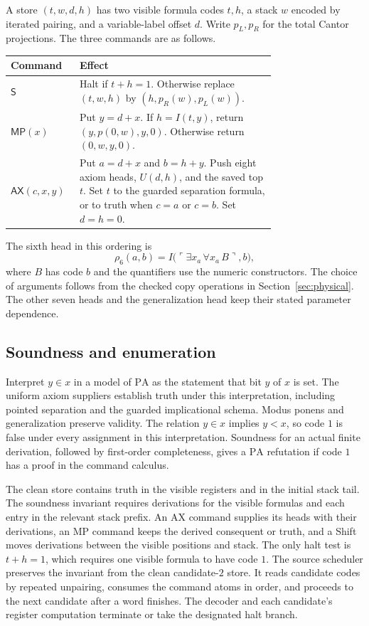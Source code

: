 \documentclass[11pt,letterpaper]{article}
\newcommand{\PA}{\mathrm{PA}}
\newcommand{\ax}{\mathsf{AX}}
\newcommand{\mpc}{\mathsf{MP}}
\newcommand{\shift}{\mathsf{S}}
\begin{document}
A store $(t,w,d,h)$ has two visible formula codes $t,h$, a stack $w$
encoded by iterated pairing, and a variable-label offset $d$.
Write $p_L,p_R$ for the total Cantor projections. The three
commands are as follows.
\begin{center}\small
\begin{tabular}{@{}lp{0.74\linewidth}@{}}
\toprule
Command & Effect \\
\midrule
$\shift$ & Halt if $t+h=1$. Otherwise replace $(t,w,h)$ by
$(h,p_R(w),p_L(w))$. \\
$\mpc(x)$ & Put $y=d+x$. If $h=I(t,y)$, return $(y,p(0,w),y,0)$.
Otherwise return $(0,w,y,0)$. \\
$\ax(c,x,y)$ & Put $a=d+x$ and $b=h+y$. Push eight axiom heads,
$U(d,h)$, and the saved top $t$. Set $t$ to the guarded separation
formula, or to truth when $c=a$ or $c=b$. Set $d=h=0$. \\
\bottomrule
\end{tabular}
\end{center}
The sixth head in this ordering is
\[
   \rho_6(a,b)=I\bigl(\ulcorner\exists x_a\,\forall x_a\,B\urcorner,b\bigr),
\]
where $B$ has code $b$ and the quantifiers use the numeric constructors.
The choice of arguments follows from the checked copy operations in
Section~\ref{sec:physical}. The other seven heads and the
generalization head keep their stated parameter dependence.

\subsection{Soundness and enumeration}

Interpret $y\in x$ in a model of $\PA$ as the statement that bit $y$ of
$x$ is set. The uniform axiom suppliers establish truth under this
interpretation, including pointed separation and the guarded
implicational schema. Modus ponens and generalization preserve
validity. The relation $y\in x$ implies $y<x$, so code $1$ is false
under every assignment in this interpretation. Soundness for an
actual finite derivation, followed by first-order completeness, gives
a $\PA$ refutation if code $1$ has a proof in the command calculus.

The clean store contains truth in the visible registers and in the
initial stack tail. The soundness invariant requires derivations for
the visible formulas and each entry in the relevant stack prefix.
An AX command supplies its heads with their derivations, an MP
command keeps the derived consequent or truth, and a Shift moves
derivations between the visible positions and stack. The only halt
test is $t+h=1$, which requires one visible formula to have code $1$.
The source scheduler preserves the invariant from the clean
candidate-$2$ store. It reads candidate codes by repeated unpairing,
consumes the command atoms in order, and proceeds to the next
candidate after a word finishes. The decoder and each candidate's
register computation terminate or take the designated halt branch.
\end{document}
